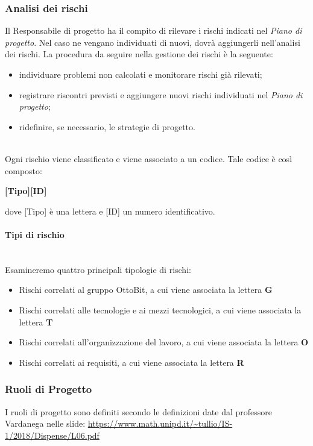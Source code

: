 \documentclass[11pt,a4paper]{article}
\begin{document}
\subsubsection{Analisi dei rischi}

Il Responsabile di progetto ha il compito di rilevare i rischi indicati nel \textit{Piano di progetto}. Nel caso ne vengano individuati di nuovi, dovrà aggiungerli nell'analisi dei rischi. La procedura da seguire nella gestione dei rischi è la seguente:
\begin{itemize}
	\item individuare problemi non calcolati e monitorare rischi già rilevati;
	\item registrare riscontri previsti e aggiungere nuovi rischi individuati nel \textit{Piano di progetto};
	\item ridefinire, se necessario, le strategie di progetto.
\end{itemize}



\noindent \\
 Ogni rischio viene classificato e viene associato a un codice. Tale codice è così composto:
\begin{center}
	\textbf{[Tipo][ID]}
\end{center}
dove [Tipo] è una lettera e [ID] un numero identificativo.\\

\paragraph{Tipi di rischio} 
\noindent \\
 Esamineremo quattro principali tipologie di rischi:

\begin{itemize}
	\item Rischi correlati al gruppo OttoBit, a cui viene associata la lettera \textbf{G}
	\item Rischi correlati alle tecnologie e ai mezzi tecnologici, a cui viene associata la lettera \textbf{T}
	\item Rischi correlati all'organizzazione del lavoro, a cui viene associata la lettera \textbf{O}
	\item Rischi correlati ai requisiti, a cui viene associata la lettera \textbf{R}
\end{itemize}

\subsubsection{Ruoli di Progetto}
I ruoli di progetto sono definiti secondo le definizioni date dal professore Vardanega nelle slide:
\url{https://www.math.unipd.it/~tullio/IS-1/2018/Dispense/L06.pdf}
\end{document}

